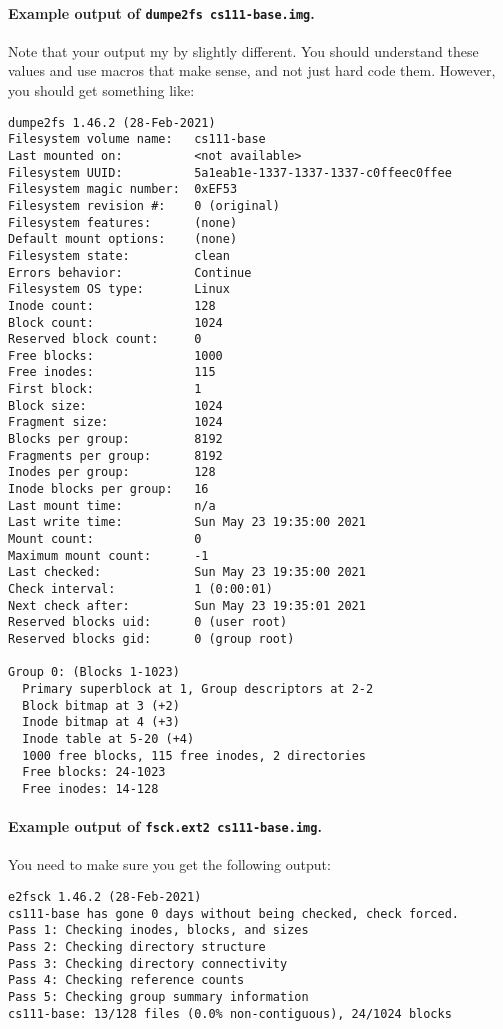\newpage

\paragraph{Example output of \lstinline|dumpe2fs cs111-base.img|.}

Note that your output my by slightly different. You should understand these
values and use macros that make sense, and not just hard code them.
However, you should get something like:

\begin{lstlisting}
dumpe2fs 1.46.2 (28-Feb-2021)
Filesystem volume name:   cs111-base
Last mounted on:          <not available>
Filesystem UUID:          5a1eab1e-1337-1337-1337-c0ffeec0ffee
Filesystem magic number:  0xEF53
Filesystem revision #:    0 (original)
Filesystem features:      (none)
Default mount options:    (none)
Filesystem state:         clean
Errors behavior:          Continue
Filesystem OS type:       Linux
Inode count:              128
Block count:              1024
Reserved block count:     0
Free blocks:              1000
Free inodes:              115
First block:              1
Block size:               1024
Fragment size:            1024
Blocks per group:         8192
Fragments per group:      8192
Inodes per group:         128
Inode blocks per group:   16
Last mount time:          n/a
Last write time:          Sun May 23 19:35:00 2021
Mount count:              0
Maximum mount count:      -1
Last checked:             Sun May 23 19:35:00 2021
Check interval:           1 (0:00:01)
Next check after:         Sun May 23 19:35:01 2021
Reserved blocks uid:      0 (user root)
Reserved blocks gid:      0 (group root)

Group 0: (Blocks 1-1023)
  Primary superblock at 1, Group descriptors at 2-2
  Block bitmap at 3 (+2)
  Inode bitmap at 4 (+3)
  Inode table at 5-20 (+4)
  1000 free blocks, 115 free inodes, 2 directories
  Free blocks: 24-1023
  Free inodes: 14-128
\end{lstlisting}

\paragraph{Example output of \lstinline|fsck.ext2 cs111-base.img|.}

You need to make sure you get the following output:

\begin{lstlisting}
e2fsck 1.46.2 (28-Feb-2021)
cs111-base has gone 0 days without being checked, check forced.
Pass 1: Checking inodes, blocks, and sizes
Pass 2: Checking directory structure
Pass 3: Checking directory connectivity
Pass 4: Checking reference counts
Pass 5: Checking group summary information
cs111-base: 13/128 files (0.0% non-contiguous), 24/1024 blocks
\end{lstlisting}



